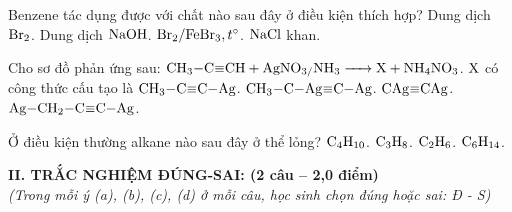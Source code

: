 \documentclass[11pt,a4paper]{article}
\begin{document}
\begin{ex}
Benzene tác dụng được với chất nào sau đây ở điều kiện thích hợp?
\choice
{Dung dịch $\ce{Br2}$.}
{Dung dịch $\ce{NaOH}$.}
{\True $\ce{Br2}/\ce{FeBr3}, t^\circ$.}
{$\ce{NaCl}$ khan.}
\end{ex}
\begin{ex}
Cho sơ đồ phản ứng sau: $\ce{CH3-C#CH + AgNO3/NH3 -> X + NH4NO3}$. $\ce{X}$ có công thức cấu tạo là
\choice
{\True $\ce{CH3-C#C-Ag}$.}
{$\ce{CH3-C-Ag#C-Ag}$.}
{$\ce{CAg#CAg}$.}
{$\ce{Ag-CH2-C#C-Ag}$.}
\end{ex}
\begin{ex}
Ở điều kiện thường alkane nào sau đây ở thể lỏng?
\choice
{$\ce{C4H10}$.}
{$\ce{C3H8}$.}
{$\ce{C2H6}$.}
{\True $\ce{C6H14}$.}
\end{ex}
\vspace{4pt}
\noindent
{\color{mainGreen}\textbf{\large II. TRẮC NGHIỆM ĐÚNG-SAI: (2 câu -- 2,0 điểm)}}\\
\textit{\small (Trong mỗi ý (a), (b), (c), (d) ở mỗi câu, học sinh chọn đúng hoặc sai: Đ - S)}
\vspace{2pt}
\end{document}
